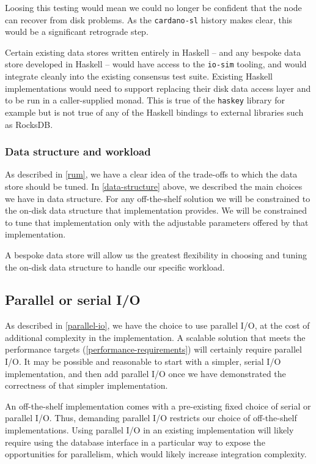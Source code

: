 \documentclass[11pt,a4paper]{article}
\begin{document}
Loosing this testing would mean we could no longer be confident that the node
can recover from disk problems. As the {\tt cardano-sl} history makes clear,
this would be a significant retrograde step.

Certain existing data stores written entirely in Haskell -- and any bespoke
data store developed in Haskell -- would have access to the {\tt io-sim}
tooling, and would integrate cleanly into the existing consensus test suite.
Existing Haskell implementations would need to support replacing their disk
data access layer and to be run in a caller-supplied monad. This is true of the
{\tt haskey} library for example but is not true of any of the Haskell bindings
to external libraries such as RocksDB.

\subsubsection{Data structure and workload}

As described in \cref{rum}, we have a clear idea of the trade-offs to which the
data store should be tuned. In \cref{data-structure} above, we described the
main choices we have in data structure. For any off-the-shelf solution we will
be constrained to the on-disk data structure that implementation provides. We
will be constrained to tune that implementation only with the adjustable
parameters offered by that implementation.

A bespoke data store will allow us the greatest flexibility in choosing and
tuning the on-disk data structure to handle our specific workload.

\subsection{Parallel or serial I/O}

As described in \cref{parallel-io}, we have the choice to use parallel I/O,
at the cost of additional complexity in the implementation. A scalable solution
that meets the performance targets (\cref{performance-requirements})
will certainly require parallel I/O. It may be possible and reasonable to start
with a simpler, serial I/O implementation, and then add parallel I/O once we
have demonstrated the correctness of that simpler implementation.

An off-the-shelf implementation comes with a pre-existing fixed choice of
serial or parallel I/O. Thus, demanding parallel I/O restricts our choice of
off-the-shelf implementations. Using parallel I/O in an existing implementation
will likely require using the database interface in a particular way to expose
the opportunities for parallelism, which would likely increase integration
complexity.
\end{document}
